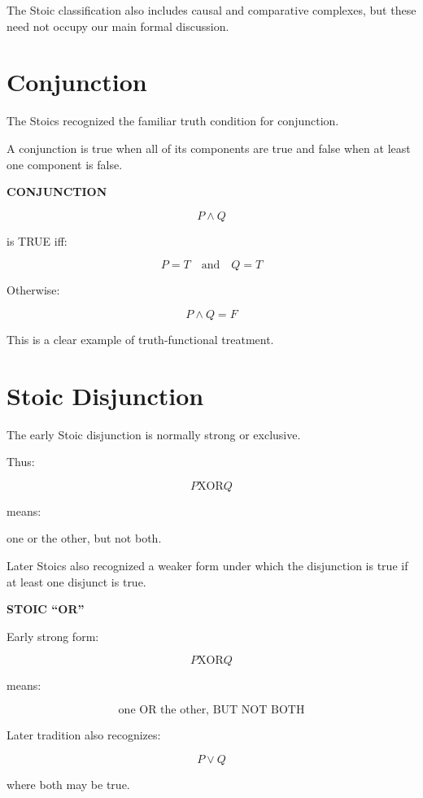 \documentclass[11pt]{article}
\newcommand{\xor}{\mathbin{\mathrm{XOR}}}
\begin{document}
The Stoic classification also includes causal and comparative
complexes, but these need not occupy our main formal discussion.

\section{Conjunction}

The Stoics recognized the familiar truth condition for
conjunction.

A conjunction is true when all of its components are true and
false when at least one component is false.

\begin{whiteboard}
\textbf{CONJUNCTION}

\[
P\land Q
\]

is TRUE iff:

\[
P=T
\quad\text{and}\quad
Q=T
\]

Otherwise:

\[
P\land Q=F
\]
\end{whiteboard}

This is a clear example of truth-functional treatment.

\section{Stoic Disjunction}

The early Stoic disjunction is normally strong or exclusive.

Thus:

\[
P\xor Q
\]

means:

\begin{center}
one or the other, but not both.
\end{center}

Later Stoics also recognized a weaker form under which the
disjunction is true if at least one disjunct is true.

\begin{whiteboard}
\textbf{STOIC ``OR''}

Early strong form:

\[
P\xor Q
\]

means:

\[
\boxed{
\text{one OR the other, BUT NOT BOTH}
}
\]

Later tradition also recognizes:

\[
P\lor Q
\]

where both may be true.
\end{whiteboard}
\end{document}
